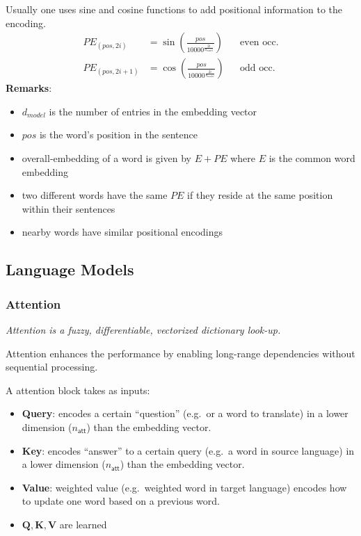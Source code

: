Usually one uses sine and cosine functions to add positional information to the encoding.
\begin{align*}
    PE_{(pos,2i)}   & =\sin\left(\frac{pos}{10000^{\frac{2i}{d_{model}}}}\right) &  & \text{even occ.} \\
    PE_{(pos,2i+1)} & =\cos\left(\frac{pos}{10000^{\frac{2i}{d_{model}}}}\right) &  & \text{odd occ.}
\end{align*}
\textbf{Remarks}:
\begin{itemize}
    \item $d_{model}$ is the number of entries in the embedding vector
    \item $pos$ is the word's position in the sentence
    \item overall-embedding of a word is given by $E+PE$ where $E$ is the common word embedding
    \item two different words have the same $PE$ if they reside at the same position within their sentences
    \item nearby words have similar positional encodings
\end{itemize}

\subsection{Language Models}
\subsubsection{Attention}
\textit{Attention is a fuzzy, differentiable, vectorized dictionary look-up.}

\newpar{}
Attention enhances the performance by enabling long-range dependencies without sequential processing.

\newpar{}
A attention block takes as inputs:
\begin{itemize}
    \item \textbf{Query}: encodes a certain ``question'' (e.g.\ or a word to translate) in a lower dimension ($n_{\mathsf{att}}$) than the embedding vector. %
    \item \textbf{Key}: encodes ``answer'' to a certain query (e.g.\ a word in source language) in a lower dimension ($n_{\mathsf{att}}$) than the embedding vector. %
    \item \textbf{Value}: weighted value (e.g.\ weighted word in target language) encodes how to update one word based on a previous word. %
    \item $\mathbf{Q}, \mathbf{K}, \mathbf{V}$ are learned
\end{itemize}

